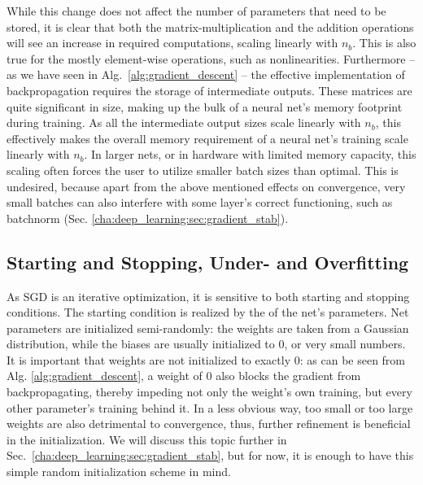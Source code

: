 			While this change does not affect the number of parameters that need to be stored, it is clear that both the matrix-multiplication and the addition operations will see an increase in required computations, scaling linearly with $n_b$.
			This is also true for the mostly element-wise operations, such as nonlinearities.
			Furthermore -- as we have seen in Alg.~\ref{alg:gradient_descent} -- the effective implementation of backpropagation requires the storage of intermediate outputs.
			These matrices are quite significant in size, making up the bulk of a neural net's memory footprint during training.
			As all the intermediate output sizes scale linearly with $n_b$, this effectively makes the overall memory requirement of a neural net's training scale linearly with $n_b$.
			In larger nets, or in hardware with limited memory capacity, this scaling often forces the user to utilize smaller batch sizes than optimal.
			This is undesired, because apart from the above mentioned effects on convergence, very small batches can also interfere with some layer's correct functioning, such as batchnorm (Sec. \ref{cha:deep_learning:sec:gradient_stab}).
	
		\subsection{Starting and Stopping, Under- and Overfitting}
			\label{cha:deep_learning:sec:overfitting}
	 
		 	As \ac{SGD} is an iterative optimization, it is sensitive to both starting and stopping conditions.
		 	The starting condition is realized by the  of the net's parameters.
		 	Net parameters are initialized semi-randomly: the weights are taken from a Gaussian distribution, while the biases are usually initialized to $0$, or very small numbers.
		 	It is important that weights are not initialized to exactly $0$: as can be seen from Alg. \ref{alg:gradient_descent}, a weight of $0$ also blocks the gradient from backpropagating, thereby impeding not only the weight's own training, but every other parameter's training behind it.
		 	In a less obvious way, too small or too large weights are also detrimental to convergence, thus, further refinement is beneficial in the initialization.
		 	We will discuss this topic further in Sec.~\ref{cha:deep_learning:sec:gradient_stab}, but for now, it is enough to have this simple random initialization scheme in mind.
		 	
